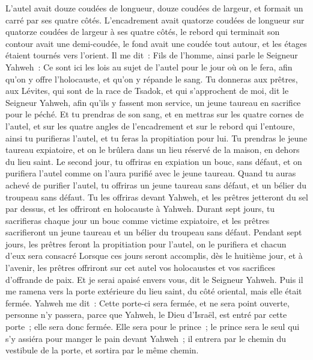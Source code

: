\begin{multicols}{2}
L'autel avait douze coudées de longueur, douze coudées de largeur, et formait un carré par ses quatre côtés.
L'encadrement avait quatorze coudées de longueur sur quatorze coudées de largeur à ses quatre côtés, le rebord qui terminait son contour avait une demi-coudée, le fond avait une coudée tout autour, et les étages étaient tournés vers l'orient.
Il me dit~: Fils de l'homme, ainsi parle le Seigneur Yahweh~: Ce sont ici les lois au sujet de l'autel pour le jour où on le fera, afin qu'on y offre l'holocauste, et qu'on y répande le sang.
Tu donneras aux prêtres, aux Lévites, qui sont de la race de Tsadok, et qui s'approchent de moi, dit le Seigneur Yahweh, afin qu'ils y fassent mon service, un jeune taureau en sacrifice pour le péché.
Et tu prendras de son sang, et en mettras sur les quatre cornes de l'autel, et sur les quatre angles de l'encadrement et sur le rebord qui l'entoure, ainsi tu purifieras l'autel, et tu feras la propitiation pour lui.
Tu prendras le jeune taureau expiatoire, et on le brûlera dans un lieu réservé de la maison, en dehors du lieu saint.
Le second jour, tu offriras en expiation un bouc, sans défaut, et on purifiera l'autel comme on l'aura purifié avec le jeune taureau.
Quand tu auras achevé de purifier l'autel, tu offriras un jeune taureau sans défaut, et un bélier du troupeau sans défaut.
Tu les offriras devant Yahweh, et les prêtres jetteront du sel par dessus, et les offriront en holocauste à Yahweh.
Durant sept jours, tu sacrifieras chaque jour un bouc comme victime expiatoire, et les prêtres sacrifieront un jeune taureau et un bélier du troupeau sans défaut.
Pendant sept jours, les prêtres feront la propitiation pour l'autel, on le purifiera et chacun d'eux sera consacré
Lorsque ces jours seront accomplis, dès le huitième jour, et à l'avenir, les prêtres offriront sur cet autel vos holocaustes et vos sacrifices d'offrande de paix. Et je serai apaisé envers vous, dit le Seigneur Yahweh.
\VerseOne{}Puis il me ramena vers la porte extérieure du lieu saint, du côté oriental, mais elle était fermée.
Yahweh me dit~: Cette porte-ci sera fermée, et ne sera point ouverte, personne n'y passera, parce que Yahweh, le Dieu d'Israël, est entré par cette porte~; elle sera donc fermée.
Elle sera pour le prince~; le prince sera le seul qui s'y assiéra pour manger le pain devant Yahweh~; il entrera par le chemin du vestibule de la porte, et sortira par le même chemin.

\end{multicols}
